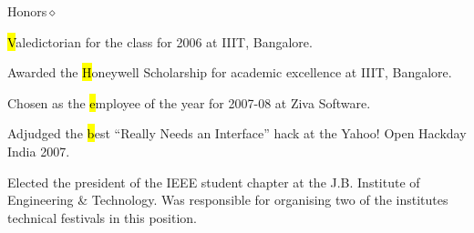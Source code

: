 \documentclass{resume}
\begin{document}
\begin{category}{Honors}{$\diamond$}

    \item {\hl Valedictorian} for the class for 2006 at IIIT, Bangalore.

    \item Awarded the {\hl Honeywell Scholarship} for academic excellence
        at IIIT, Bangalore.

    \item Chosen as the {\hl employee of the year} for 2007-08 at Ziva
        Software.

    \item Adjudged the {\hl best ``Really Needs an Interface''} hack at the
        Yahoo!  Open Hackday India 2007.

    \item Elected the president of the IEEE student chapter at the J.B. Institute
        of Engineering \& Technology. Was responsible for organising two of the
        institutes technical festivals in this position.
\end{category}
\end{document}
